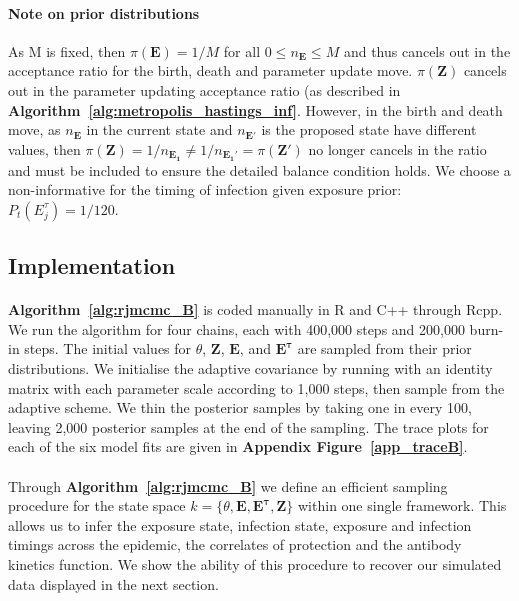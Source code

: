 \begin{algorithm}[H]
\begin{algorithmic}[1]
			\EndIf        

    \EndFor
\end{algorithmic}
\end{algorithm}

\paragraph{Note on prior distributions}As M is fixed, then $\pi(\mathbf{E}) = 1/M$ for all $0 \leq n_{\mathbf{E}} \leq M$ and thus cancels out in the acceptance ratio for the birth, death and parameter update move. $\pi(\mathbf{Z})$ cancels out in the parameter updating acceptance ratio (as described in \textbf{Algorithm~\ref{alg:metropolis_hastings_inf}}. However, in the birth and death move, as $n_{\mathbf{E}}$ in the current state and $n_{\mathbf{E}'}$ is the proposed state have different values, then $\pi(\mathbf{Z}) = 1/n_\mathbf{E_1} \neq  1/n_\mathbf{E_1'} = \pi(\mathbf{Z}')$ no longer cancels in the ratio and must be included to ensure the detailed balance condition holds. 
We choose a non-informative for the timing of infection given exposure prior: $P_t(E_j^\tau) = 1 / 120$.

\subsection{Implementation }
\paragraph{}  \textbf{Algorithm~\ref{alg:rjmcmc_B}} is coded manually in R and C++ through Rcpp. We run the algorithm for four chains, each with 400,000 steps and 200,000 burn-in steps. The initial values for $\theta$, $\mathbf{Z}$, $\mathbf{E}$, and $\mathbf{E^{\tau}}$ are sampled from their prior distributions. We initialise the adaptive covariance by running with an identity matrix with each parameter scale according to 1,000 steps, then sample from the adaptive scheme. We thin the posterior samples by taking one in every 100, leaving 2,000 posterior samples at the end of the sampling. The trace plots for each of the six model fits are given in \textbf{Appendix Figure~\ref{app_traceB}}.

\paragraph{}Through \textbf{Algorithm~\ref{alg:rjmcmc_B}} we define an efficient sampling procedure for the state space $k = \{\theta, \mathbf{E}, \mathbf{E^\tau}, \mathbf{Z}\}$ within one single framework. This allows us to infer the exposure state, infection state, exposure and infection timings across the epidemic, the correlates of protection and the antibody kinetics function. We show the ability of this procedure to recover our simulated data displayed in the next section.


